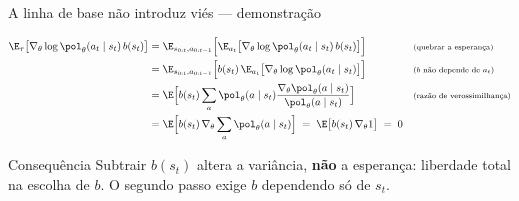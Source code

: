 \documentclass[aspectratio=169, 11pt]{beamer}
\newcommand{\thv}{\theta}                       %
\newcommand{\polth}{\pol_{\thv}}                %
\newcommand{\gth}{\nabla_{\thv}}                %
\newcommand{\traj}{\tau}                        %
\begin{document}
\begin{frame}{A linha de base não introduz viés --- demonstração}

  {\small
  \begin{align*}
    \E_{\traj}\bigl[\gth \log \polth(a_t\mid s_t)\, b(s_t)\bigr]
      &= \E_{s_{0:t},a_{0:t-1}}\Bigl[\E_{a_t}\bigl[\gth \log \polth(a_t\mid s_t)\, b(s_t)\bigr]\Bigr]
        &&\text{\scriptsize (quebrar a esperança)}\\
      &= \E_{s_{0:t},a_{0:t-1}}\Bigl[b(s_t)\,\E_{a_t}\bigl[\gth \log \polth(a_t\mid s_t)\bigr]\Bigr]
        &&\text{\scriptsize ($b$ não depende de $a_t$)}\\
      &= \E\Bigl[b(s_t) \sum_{a} \polth(a\mid s_t)
         \frac{\gth \polth(a\mid s_t)}{\polth(a\mid s_t)}\Bigr]
        &&\text{\scriptsize (razão de verossimilhança)}\\
      &= \E\Bigl[b(s_t)\, \gth \sum_{a} \polth(a\mid s_t)\Bigr]
      \;=\; \E\bigl[b(s_t)\, \gth 1\bigr] \;=\; 0
  \end{align*}}
  \vspace{-0.6em}

  \begin{teobox}{Consequência}
    Subtrair $b(s_t)$ altera a variância, \textbf{não} a esperança: liberdade
    total na escolha de $b$. O segundo passo exige $b$ dependendo só de $s_t$.
  \end{teobox}
\end{frame}
\end{document}
